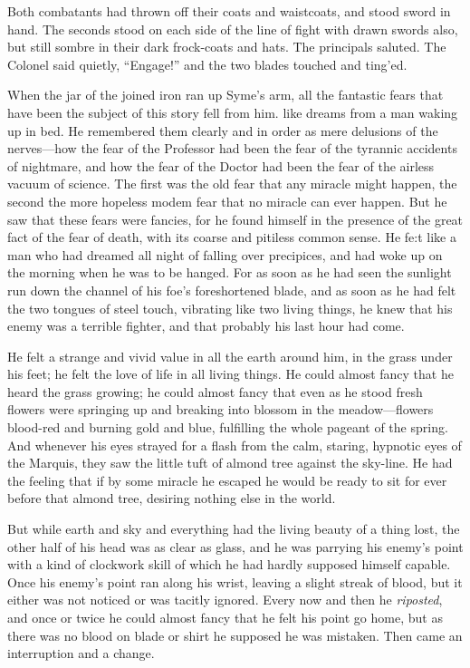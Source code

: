\documentclass{book}
\begin{document}
Both combatants had thrown off their coats and waistcoats, and stood sword in hand. The seconds stood on each side of the line of fight with drawn swords also, but still sombre in their dark frock-coats and hats. The principals saluted. The Colonel said quietly, “Engage!” and the two blades touched and ting’ed.

When the jar of the joined iron ran up Syme’s arm, all the fantastic fears that have been the subject of this story fell from him. like dreams from a man waking up in bed. He remembered them clearly and in order as mere delusions of the nerves—how the fear of the Professor had been the fear of the tyrannic accidents of nightmare, and how the fear of the Doctor had been the fear of the airless vacuum of science. The first was the old fear that any miracle might happen, the second the more hopeless modem fear that no miracle can ever happen. But he saw that these fears were fancies, for he found himself in the presence of the great fact of the fear of death, with its coarse and pitiless common sense. He fe:t like a man who had dreamed all night of falling over precipices, and had woke up on the morning when he was to be hanged. For as soon as he had seen the sunlight run down the channel of his foe’s foreshortened blade, and as soon as he had felt the two tongues of steel touch, vibrating like two living things, he knew that his enemy was a terrible fighter, and that probably his last hour had come.

He felt a strange and vivid value in all the earth around him, in the grass under his feet; he felt the love of life in all living things. He could almost fancy that he heard the grass growing; he could almost fancy that even as he stood fresh flowers were springing up and breaking into blossom in the meadow—flowers blood-red and burning gold and blue, fulfilling the whole pageant of the spring. And whenever his eyes strayed for a flash from the calm, staring, hypnotic eyes of the Marquis, they saw the little tuft of almond tree against the sky-line. He had the feeling that if by some miracle he escaped he would be ready to sit for ever before that almond tree, desiring nothing else in the world.

But while earth and sky and everything had the living beauty of a thing lost, the other half of his head was as clear as glass, and he was parrying his enemy’s point with a kind of clockwork skill of which he had hardly supposed himself capable. Once his enemy’s point ran along his wrist, leaving a slight streak of blood, but it either was not noticed or was tacitly ignored. Every now and then he \emph{riposted}, and once or twice he could almost fancy that he felt his point go home, but as there was no blood on blade or shirt he supposed he was mistaken. Then came an interruption and a change.
\end{document}
